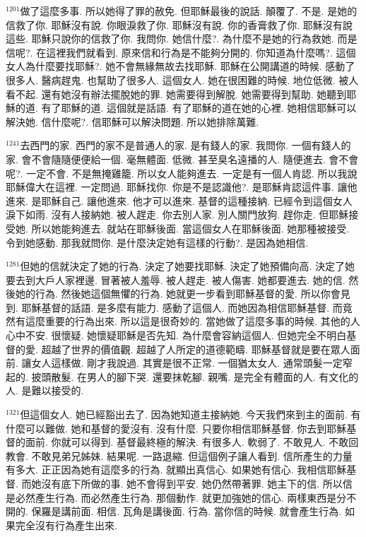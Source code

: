 \documentclass{book}
\begin{document}
$^{1201}$做了這麼多事.
所以她得了罪的赦免.
但耶穌最後的說話.
顛覆了.
不是.
是她的信救了你.
耶穌沒有說.
你眼淚救了你.
耶穌沒有說.
你的香膏救了你.
耶穌沒有說這些.
耶穌只說你的信救了你.
我問你.
她信什麼?.
為什麼不是她的行為救她.
而是信呢?.
在這裡我們就看到.
原來信和行為是不能夠分開的.
你知道為什麼嗎?.
這個女人為什麼要找耶穌?.
她不會無緣無故去找耶穌.
耶穌在公開講道的時候.
感動了很多人.
醫病趕鬼.
也幫助了很多人.
這個女人.
她在很困難的時候.
地位低微.
被人看不起.
還有她沒有辦法擺脫她的罪.
她需要得到解脫.
她需要得到幫助.
她聽到耶穌的道.
有了耶穌的道.
這個就是話語.
有了耶穌的道在她的心裡.
她相信耶穌可以解決她.
信什麼呢?.
信耶穌可以解決問題.
所以她排除萬難.

$^{1241}$去西門的家.
西門的家不是普通人的家.
是有錢人的家.
我問你.
一個有錢人的家.
會不會隨隨便便給一個.
毫無體面.
低微.
甚至臭名遠播的人.
隨便進去.
會不會呢?.
一定不會.
不是無掩雞籠.
所以女人能夠進去.
一定是有一個人肯認.
所以我說耶穌偉大在這裡.
一定問過.
耶穌找你.
你是不是認識他?.
是耶穌肯認這件事.
讓他進來.
是耶穌自己.
讓他進來.
他才可以進來.
基督的這種接納.
已經令到這個女人淚下如雨.
沒有人接納她.
被人趕走.
你去別人家.
別人關門放狗.
趕你走.
但耶穌接受她.
所以她能夠進去.
就站在耶穌後面.
當這個女人在耶穌後面.
她那種被接受.
令到她感動.
那我就問你.
是什麼決定她有這樣的行動?.
是因為她相信.

$^{1281}$但她的信就決定了她的行為.
決定了她要找耶穌.
決定了她預備向高.
決定了她要去到大戶人家裡邊.
冒著被人羞辱.
被人趕走.
被人傷害.
她都要進去.
她的信.
然後她的行為.
然後她這個無懼的行為.
她就更一步看到耶穌基督的愛.
所以你會見到.
耶穌基督的話語.
是多麼有能力.
感動了這個人.
而她因為相信耶穌基督.
而竟然有這麼重要的行為出來.
所以這是很奇妙的.
當她做了這麼多事的時候.
其他的人心中不安.
很懷疑.
她懷疑耶穌是否先知.
為什麼會容納這個人.
但她完全不明白基督的愛.
超越了世界的價值觀.
超越了人所定的道德範疇.
耶穌基督就是要在眾人面前.
讓女人這樣做.
剛才我說過.
其實是很不正常.
一個猶太女人.
通常頭髮一定窄起的.
披頭散髮.
在男人的腳下哭.
還要抹乾腳.
親嘴.
是完全有體面的人.
有文化的人.
是難以接受的.

$^{1321}$但這個女人.
她已經豁出去了.
因為她知道主接納她.
今天我們來到主的面前.
有什麼可以難做.
她和基督的愛沒有.
沒有什麼.
只要你相信耶穌基督.
你去到耶穌基督的面前.
你就可以得到.
基督最終極的解決.
有很多人.
軟弱了.
不敢見人.
不敢回教會.
不敢見弟兄姊妹.
結果呢.
一路退縮.
但這個例子讓人看到.
信所產生的力量有多大.
正正因為她有這麼多的行為.
就顯出真信心.
如果她有信心.
我相信耶穌基督.
而她沒有底下所做的事.
她不會得到平安.
她仍然帶著罪.
她主下的信.
所以信是必然產生行為.
而必然產生行為.
那個動作.
就更加強她的信心.
兩樣東西是分不開的.
保羅是講前面.
相信.
瓦角是講後面.
行為.
當你信的時候.
就會產生行為.
如果完全沒有行為產生出來.
\end{document}
